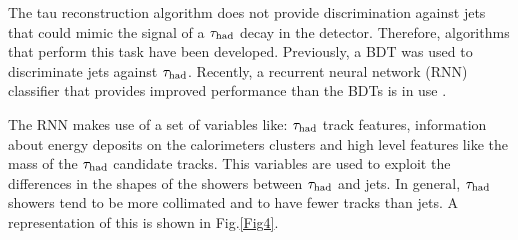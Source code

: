 The tau reconstruction algorithm does not provide discrimination against jets that could mimic the signal of a $\tau_\text{had}$ decay in the detector. Therefore, algorithms that perform this task have been developed. Previously, a BDT was used to discriminate jets against $\tau_\text{had}$. Recently, a recurrent neural network (RNN) classifier that provides improved performance than the BDTs is in use \cite{Deutsch:2680523}.

The RNN makes use of a set of variables like: $\tau_\text{had}$ track features, information about energy deposits on the calorimeters clusters and high level features like the mass of the $\tau_\text{had}$ candidate tracks. This variables are used to exploit the differences in the shapes of the showers between $\tau_\text{had}$ and jets. In general, $\tau_\text{had}$ showers tend to be more collimated and to have fewer tracks than jets. A representation of this is shown in Fig.\ref{Fig4}. 


